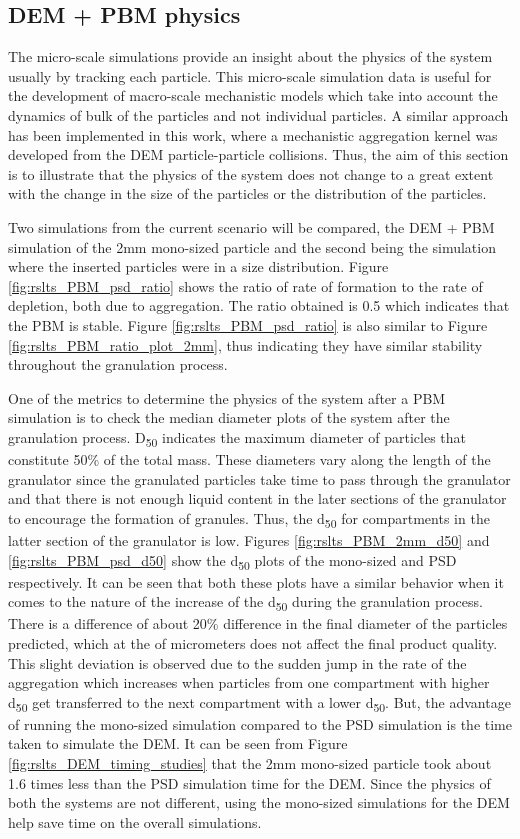 \documentclass[preprint,11pt,authoryear]{elsarticle}
\begin{document}
\subsection{DEM + PBM physics}
The micro-scale simulations provide an insight about the physics of the system usually by tracking 
each particle. This micro-scale simulation data is useful for the development of macro-scale 
mechanistic models which take into account the dynamics of bulk of the particles and not individual 
particles. A similar approach has been implemented in this work, where a mechanistic aggregation 
kernel was developed from the DEM particle-particle collisions. Thus, the aim of this section is to 
illustrate that the physics of the system does not change to a great extent with the change in the size 
of the particles or the distribution of the particles.

Two simulations from the current scenario will be compared, the DEM + PBM simulation of the 2mm 
mono-sized particle and the second being the simulation where the inserted particles were in a size 
distribution. Figure \ref{fig:rslts_PBM_psd_ratio} shows the ratio of rate of formation to the rate of 
depletion, both due to aggregation. The ratio obtained is 0.5 which indicates that the PBM is stable. 
Figure \ref{fig:rslts_PBM_psd_ratio} is also similar to Figure \ref{fig:rslts_PBM_ratio_plot_2mm}, thus 
indicating they have similar stability throughout the granulation process. 

One of the metrics to determine the physics of the system after a PBM simulation is to check the 
median diameter plots of the system after the granulation process. 
D\textsubscript{50} indicates the 
maximum diameter of particles that constitute 50\% of the total mass. These diameters vary along the 
length of the granulator since the granulated particles take time to pass through the granulator and 
that there is not enough liquid content in the later sections of the granulator to encourage the 
formation of granules. Thus, the d\textsubscript{50} for compartments in the latter section of the 
granulator is low. Figures \ref{fig:rslts_PBM_2mm_d50} and \ref{fig:rslts_PBM_psd_d50} show the 
d\textsubscript{50} plots of the mono-sized and PSD respectively. It can be 
seen that both these plots 
have a similar behavior when it comes to the nature of the increase of the d\textsubscript{50} during 
the granulation process. There is a difference of about 20\% difference in the final diameter of the 
particles predicted, which at the of micrometers does not affect the final product quality. This slight 
deviation is observed due to the sudden jump in the rate of the aggregation which increases when 
particles from one compartment with higher d\textsubscript{50} get transferred to the next 
compartment with a lower d\textsubscript{50}. But, the advantage of running the mono-sized 
simulation compared to the PSD simulation is the time taken to simulate the 
DEM. It can be seen from 
Figure \ref{fig:rslts_DEM_timing_studies} that the 2mm mono-sized particle took about 1.6 times less 
than the PSD simulation time for the DEM. Since the physics of both the systems 
are not different, 
using the mono-sized simulations for the DEM help save time on the overall simulations. 
\end{document}
